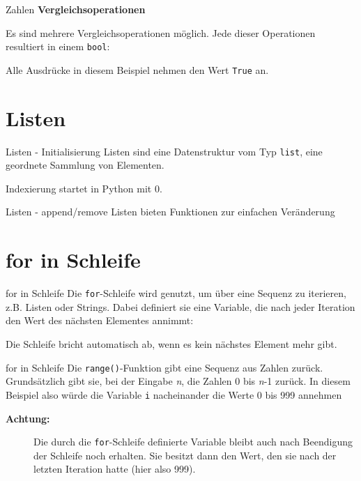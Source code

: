 \begin{frame}{Zahlen}
	\textbf{Vergleichsoperationen}
	\linebreak
	
	Es sind mehrere Vergleichsoperationen möglich. Jede dieser Operationen resultiert in einem \alert{\texttt{bool}}:		
	
	Alle Ausdrücke in diesem Beispiel nehmen den Wert \alert{\texttt{True}} an.
\end{frame}

\section{Listen}
\begin{frame}{Listen - Initialisierung}
	Listen sind eine Datenstruktur vom Typ \alert{\texttt{list}}, eine geordnete Sammlung von Elementen.
	
	Indexierung startet in Python mit 0.
	
\end{frame}
\begin{frame}{Listen - append/remove}
	Listen bieten Funktionen zur einfachen Veränderung
	
	
	
	
\end{frame}

\section{for in Schleife}
\begin{frame}{for in Schleife}
	Die \alert{\texttt{for}}-Schleife wird genutzt, um über eine Sequenz zu iterieren, z.B. Listen oder Strings. Dabei definiert sie eine Variable, die nach jeder Iteration den Wert des nächsten Elementes annimmt:
	
	
	Die Schleife bricht automatisch ab, wenn es kein nächstes Element mehr gibt.
\end{frame}

\begin{frame}{for in Schleife}
	Die \alert{\texttt{range()}}-Funktion gibt eine Sequenz aus Zahlen zurück. Grundsätzlich gibt sie, bei der Eingabe \textit{n}, die Zahlen 0 bis \textit{n}-1 zurück. In diesem Beispiel also würde die Variable \alert{\texttt{i}} nacheinander die Werte 0 bis 999 annehmen
	
	\begin{description}
		\item[\textbf{Achtung:}] Die durch die \alert{\texttt{for}}-Schleife definierte Variable bleibt auch nach Beendigung der Schleife noch erhalten. Sie besitzt dann den Wert, den sie nach der letzten Iteration hatte (hier also 999).
	\end{description}
\end{frame}

